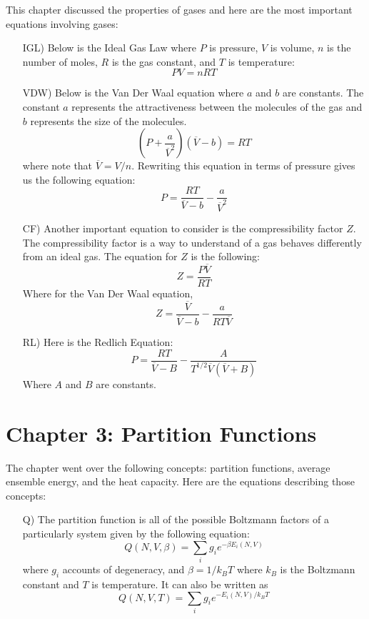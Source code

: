 \documentclass{article}
\begin{document}
This chapter discussed the properties of gases and here are the most important equations involving gases: 
\begin{enumerate}
    \item[IGL)] Below is the Ideal Gas Law where $P$ is pressure, $V$ is volume, $n$ is the number of moles, $R$ is the gas constant, and $T$ is temperature:
    $$PV=nRT$$

    \item[VDW)] Below is the Van Der Waal equation where $a$ and $b$ are constants. The constant $a$ represents the attractiveness between the molecules of the gas and $b$ represents the size of the molecules. 
    $$\left(P+\frac{a}{\overline{V}^2}\right)(\overline{V}-b)=RT$$
    where note that $\overline{V}=V/n$. Rewriting this equation in terms of pressure gives us the following equation: 
    $$P=\frac{RT}{\overline{V}-b}-\frac{a}{\overline{V}^2}$$

    \item[CF)] Another important equation to consider is the compressibility factor $Z$. The compressibility factor is a way to understand of a gas behaves differently from an ideal gas. The equation for $Z$ is the following: 
    $$Z=\frac{P\overline{V}}{RT}$$
    Where for the Van Der Waal equation,
    $$Z=\frac{\overline{V}}{\overline{V}-b}-\frac{a}{RT\overline{V}}$$

    \item[RL)] Here is the Redlich Equation:
    $$P=\frac{RT}{\overline{V}-B}-\frac{A}{T^{1/2}\overline{V}(\overline{V}+B)}$$
    Where $A$ and $B$ are constants.
\end{enumerate}
\section{Chapter 3: Partition Functions}

The chapter went over the following concepts: partition functions, average ensemble energy, and the heat capacity. Here are the equations describing those concepts:

\begin{enumerate}
    \item[Q)] The partition function is all of the possible Boltzmann factors of a particularly system given by the following equation: 
    $$Q(N,V,\beta)=\sum_ig_ie^{-\beta E_i(N,V)}$$
    where $g_i$ accounts of degeneracy, and $\beta=1/k_BT$ where $k_B$ is the Boltzmann constant and $T$ is temperature. It can also be written as 
    $$Q(N,V,T)=\sum_ig_ie^{- E_i(N,V)/k_BT}$$
\end{enumerate}
\end{document}
